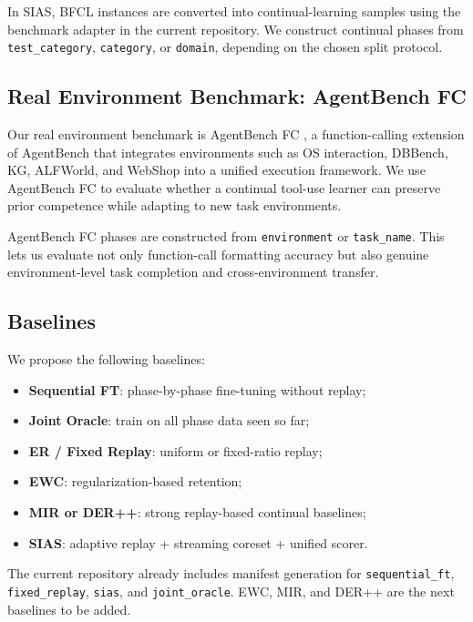 \documentclass{article}
\begin{document}
In SIAS, BFCL instances are converted into continual-learning samples using the benchmark adapter in the current repository. We construct continual phases from \texttt{test\_category}, \texttt{category}, or \texttt{domain}, depending on the chosen split protocol.

\subsection{Real Environment Benchmark: AgentBench FC}

Our real environment benchmark is AgentBench FC \citep{agentbenchfc2025}, a function-calling extension of AgentBench that integrates environments such as OS interaction, DBBench, KG, ALFWorld, and WebShop into a unified execution framework. We use AgentBench FC to evaluate whether a continual tool-use learner can preserve prior competence while adapting to new task environments.

AgentBench FC phases are constructed from \texttt{environment} or \texttt{task\_name}. This lets us evaluate not only function-call formatting accuracy but also genuine environment-level task completion and cross-environment transfer.

\subsection{Baselines}

We propose the following baselines:
\begin{itemize}[leftmargin=12pt]
    \item \textbf{Sequential FT}: phase-by-phase fine-tuning without replay;
    \item \textbf{Joint Oracle}: train on all phase data seen so far;
    \item \textbf{ER / Fixed Replay}: uniform or fixed-ratio replay;
    \item \textbf{EWC}: regularization-based retention;
    \item \textbf{MIR or DER++}: strong replay-based continual baselines;
    \item \textbf{SIAS}: adaptive replay + streaming coreset + unified scorer.
\end{itemize}

The current repository already includes manifest generation for \texttt{sequential\_ft}, \texttt{fixed\_replay}, \texttt{sias}, and \texttt{joint\_oracle}. EWC, MIR, and DER++ are the next baselines to be added.
\end{document}
